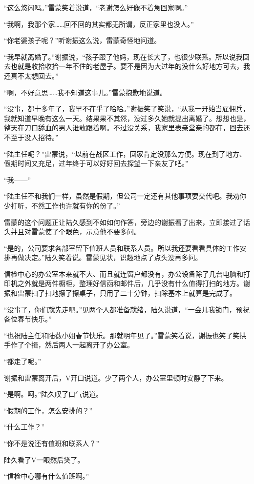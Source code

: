 “这么悠闲吗。”雷蒙笑着说道，“老谢怎么好像不着急回家啊。”

“我啊，我那个家……回不回的其实都无所谓，反正家里也没人。”

“你老婆孩子呢？”听谢振这么说，雷蒙奇怪地问道。

“我早就离婚了。”谢振说，“孩子跟了他妈，现在长大了，也很少联系。所以说我回去也就是收拾收拾一年不住的老屋子。要不是因为大过年的没什么好地方可去，我还真不太想回去。”

“啊，不好意思……我不知道这事儿。”雷蒙抱歉地说道。

“没事，都十多年了，我早不在乎了哈哈。”谢振笑了笑说，“从我一开始当雇佣兵，我就知道早晚有这么一天。结果果不其然，没过多久她就提出离婚了。想想也是，整天在刀口舔血的男人谁敢跟着啊。不过没关系，我家里表亲堂亲的都在，回去还不至于没人招待。”

“陆主任呢？”雷蒙说，“以前在战区工作，回家肯定没那么方便。现在到了地方、假期时间又充足，过年终于可以好好回去探望一下亲友了吧。”

“我——”

“陆主任不和我们一样，虽然是假期，但公司一定还有其他事项要交代吧。我劝你少打听，不然工作也许就有你的份了。”

雷蒙的这个问题正让陆久感到不如如何作答，旁边的谢振看了出来，立即接过了话头并且对雷蒙使了个眼色，示意他不要多问。

“是的，公司要求各部室留下值班人员和联系人员。所以我还要看看具体的工作安排再做决定。”陆久笑着说。雷蒙见状，识趣地点了点头没再多问。

信检中心的办公室本来就不大、而且就连窗户都没有，办公设备除了几台电脑和打印机之外就是两件橱柜，整理好信函和邮件后，几乎没有什么值得打扫的地方。谢振和雷蒙扫了扫地擦了擦桌子，只用了二十分钟，扫除基本上就算是完成了。

“没事了，你们就先走吧。”见两个人都准备就绪，陆久说道，“一会儿我锁门，预祝各位春节快乐。”

“也祝陆主任和陆薇小姐春节快乐。那就明年见了。”雷蒙笑着说，谢振也笑了笑拱手作了个揖，然后两人一起离开了办公室。

“都走了呢。”

谢振和雷蒙离开后，V开口说道。少了两个人，办公室里顿时安静了下来。

“是啊。呵。”陆久叹了口气说道。

“假期的工作，怎么安排的？”

“什么工作？”

“你不是说还有值班和联系人？”

陆久看了V一眼然后笑了。

“信检中心哪有什么值班啊。”

